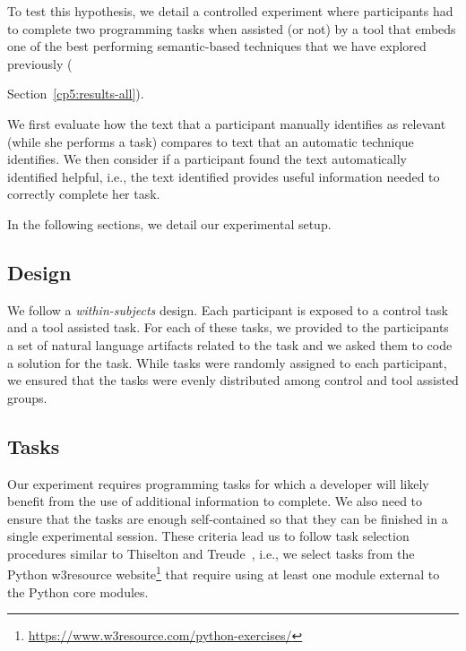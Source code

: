 To test this hypothesis, we detail a controlled experiment where participants
 had to complete two programming tasks when assisted (or not) by a
 tool that embeds one of the best performing semantic-based techniques that we have explored previously ({Section~\ref{cp5:results-all}). 


We first evaluate how the text that a participant manually identifies as relevant (while she performs a task) 
compares to text that an automatic technique identifies. 
We then consider if a participant found the text automatically identified helpful, i.e., the text identified provides useful information needed to correctly complete her task.


In the following sections, we detail our experimental setup.








\subsection{Design}


We follow a \textit{within-subjects} design. Each participant is exposed to a control task and a tool assisted task. For each of these tasks, we provided to the participants a set of natural language artifacts related to the task
and we asked them to code a solution for the task. While tasks were randomly assigned to each participant, 
we ensured that the tasks were evenly distributed among control and tool assisted groups. 





\subsection{Tasks}


Our experiment requires programming tasks for which a developer will likely benefit from the use of additional information to complete. We also need to ensure that the tasks are enough self-contained so that they can be finished in a single experimental session. These criteria lead us to 
follow task selection procedures similar to Thiselton and Treude~\cite{thiselton2019}, 
i.e., we select tasks from the Python w3resource website\footnote{\url{https://www.w3resource.com/python-exercises/}}
that require using at least one module external to the Python core modules. 



}
